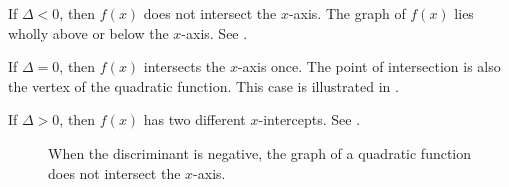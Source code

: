 \documentclass[a4paper,oneside,12pt]{article}
\begin{document}
\begin{packedenumeral}
\item If $\Delta < 0$, then $f(x)$ does not intersect the $x$-axis.
  The graph of $f(x)$ lies wholly above or below the $x$-axis.  See
  .

\item If $\Delta = 0$, then $f(x)$ intersects the $x$-axis once.  The
  point of intersection is also the vertex of the quadratic function.
  This case is illustrated in .

\item If $\Delta > 0$, then $f(x)$ has two different $x$-intercepts.
  See .
\end{packedenumeral}

\begin{figure}[!htbp]
\centering
{}
\quad
\caption{%
  When the discriminant is negative, the graph of a quadratic function
  does not intersect the $x$-axis.
}
\label{fig:negative_discriminant}
\end{figure}
\end{document}
